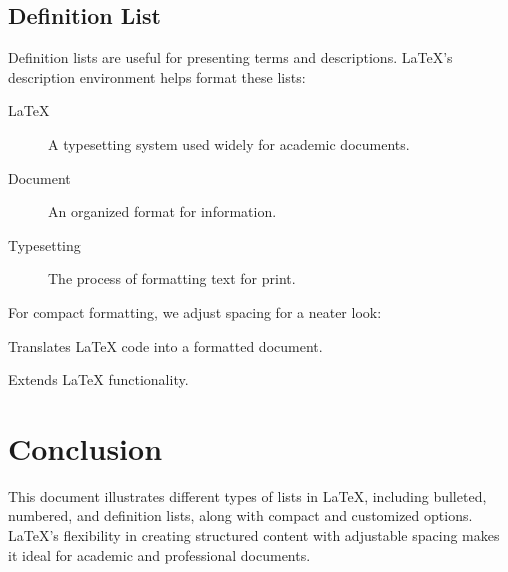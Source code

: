 \documentclass[12pt]{article}
\begin{document}
\subsection{Definition List}
Definition lists are useful for presenting terms and descriptions. LaTeX’s description environment helps format these lists:

\begin{description}
    \item[LaTeX] A typesetting system used widely for academic documents.
    \item[Document] An organized format for information.
    \item[Typesetting] The process of formatting text for print.
\end{description}

For compact formatting, we adjust spacing for a neater look:

\begin{description}[noitemsep, topsep=0pt]
    \item[Compiler] Translates LaTeX code into a formatted document.
    \item[Package] Extends LaTeX functionality.
\end{description}

\section{Conclusion}
This document illustrates different types of lists in LaTeX, including bulleted, numbered, and definition lists, along with compact and customized options. LaTeX’s flexibility in creating structured content with adjustable spacing makes it ideal for academic and professional documents.
\end{document}
